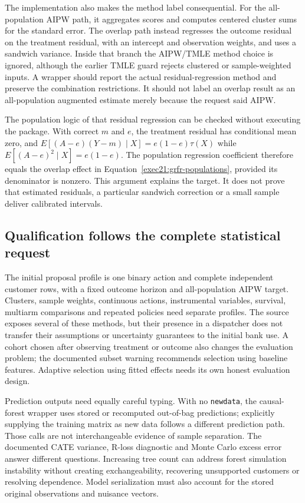The implementation also makes the method label consequential. For the all-population AIPW path, it aggregates scores and computes centered cluster sums for the standard error. The overlap path instead regresses the outcome residual on the treatment residual, with an intercept and observation weights, and uses a sandwich variance. Inside that branch the AIPW/TMLE method choice is ignored, although the earlier TMLE guard rejects clustered or sample-weighted inputs. A wrapper should report the actual residual-regression method and preserve the combination restrictions. It should not label an overlap result as an all-population augmented estimate merely because the request said AIPW.\citep{exec21_grf_reuse}

The population logic of that residual regression can be checked without executing the package. With correct $m$ and $e$, the treatment residual has conditional mean zero, and
$E[(A-e)(Y-m)\mid X]=e(1-e)\tau(X)$ while
$E[(A-e)^2\mid X]=e(1-e)$. The population regression coefficient therefore equals the overlap effect in Equation~\eqref{exec21:grfr-populations}, provided its denominator is nonzero. This argument explains the target. It does not prove that estimated residuals, a particular sandwich correction or a small sample deliver calibrated intervals.

\subsection{Qualification follows the complete statistical request}
\label{exec21:grfr-contract}
The initial proposal profile is one binary action and complete independent customer rows, with a fixed outcome horizon and all-population AIPW target. Clusters, sample weights, continuous actions, instrumental variables, survival, multiarm comparisons and repeated policies need separate profiles. The source exposes several of these methods, but their presence in a dispatcher does not transfer their assumptions or uncertainty guarantees to the initial bank use. A cohort chosen after observing treatment or outcome also changes the evaluation problem; the documented subset warning recommends selection using baseline features. Adaptive selection using fitted effects needs its own honest evaluation design.\citep{exec21_grf_reuse}

Prediction outputs need equally careful typing. With no \texttt{newdata}, the causal-forest wrapper uses stored or recomputed out-of-bag predictions; explicitly supplying the training matrix as new data follows a different prediction path. Those calls are not interchangeable evidence of sample separation. The documented CATE variance, R-loss diagnostic and Monte Carlo excess error answer different questions. Increasing tree count can address forest simulation instability without creating exchangeability, recovering unsupported customers or resolving dependence. Model serialization must also account for the stored original observations and nuisance vectors.\citep{exec21_grf_reuse}

